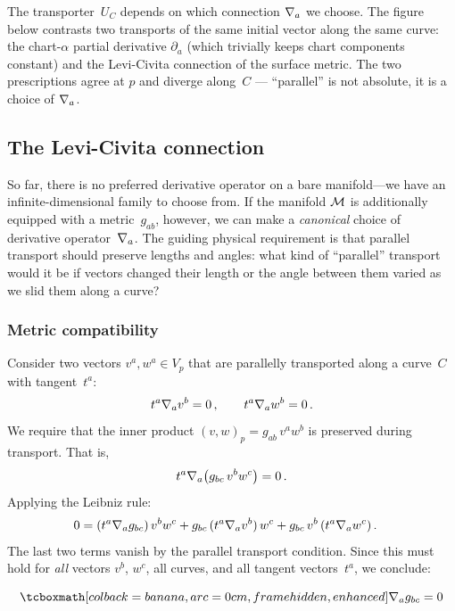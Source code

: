 \noindent
The transporter~$U_C$ depends on which connection $\nabla_a$ we
choose.  The figure below contrasts two transports of the same
initial vector along the same curve: the chart-$\alpha$ partial
derivative $\partial_a$ (which trivially keeps chart components
constant) and the Levi-Civita connection of the surface metric.
The two prescriptions agree at $p$ and diverge along~$C$ ---
``parallel'' is not absolute, it is a choice of $\nabla_a$.



\subsection{The Levi-Civita connection}%
\label{sec:levi-civita}

So far, there is no preferred derivative operator on a bare
manifold---we have an infinite-dimensional family to choose from.
If the manifold $\mathcal{M}$ is additionally equipped with a
metric~$g_{ab}$, however, we can make a \emph{canonical} choice
of derivative operator~$\nabla_a$.  The guiding physical
requirement is that parallel transport should preserve lengths
and angles: what kind of ``parallel'' transport would it be if
vectors changed their length or the angle between them varied as
we slid them along a curve?

\subsubsection{Metric compatibility}\label{sec:metric-compat}

Consider two vectors $v^a, w^a \in V_p$ that are parallelly
transported along a curve~$C$ with tangent~$t^a$:
\[
  t^a \nabla_a v^b = 0\,,
  \qquad
  t^a \nabla_a w^b = 0\,.
\]
We require that the inner product
$(v,w)_p = g_{ab}\, v^a w^b$ is preserved during transport.
That is,
\[
  t^a \nabla_a \bigl(g_{bc}\, v^b w^c\bigr) = 0\,.
\]
Applying the Leibniz rule:
\begin{align}
  0 &= (t^a \nabla_a g_{bc})\, v^b w^c
     + g_{bc}\,(t^a \nabla_a v^b)\, w^c
     + g_{bc}\, v^b\,(t^a \nabla_a w^c)\,.
     \label{eq:leibniz-metric}
\end{align}
The last two terms vanish by the parallel transport condition.
Since this must hold for \emph{all} vectors $v^b$, $w^c$, all
curves, and all tangent vectors~$t^a$, we conclude:

\begin{equation}\label{eq:metric-compatibility}
  \eqbox{\covd_a g_{bc} = 0}
\end{equation}

